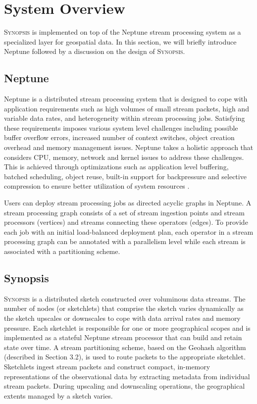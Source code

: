 \section{System Overview}
\label{sec:system}
\textsc{Synopsis} is implemented on top of the Neptune stream processing system \cite{buddhika2016neptune} as a specialized layer for geospatial data.
In this section, we will briefly introduce Neptune followed by a discussion on the design of \textsc{Synopsis}.

\subsection{Neptune}
Neptune is a distributed stream processing system that is designed to cope with application requirements such as high volumes of small stream packets, high and variable data rates, and heterogeneity within stream processing jobs.
Satisfying these requirements imposes various system level challenges including possible buffer overflow errors, increased number of context switches, object creation overhead and memory management issues.
Neptune takes a holistic approach that considers CPU, memory, network and kernel issues to address these challenges.
This is achieved through optimizations such as application level buffering, batched scheduling, object reuse, built-in support for backpressure and selective compression to ensure better utilization of system resources \cite{buddhika2016neptune}.

Users can deploy stream processing jobs as directed acyclic graphs in Neptune.
A stream processing graph consists of a set of stream ingestion points and stream processors (vertices) and streams connecting these operators (edges).
To provide each job with an initial load-balanced deployment plan, each operator in a stream processing graph can be annotated with a parallelism level while each stream is associated with a partitioning scheme.

\subsection{Synopsis}
\textsc{Synopsis} is a distributed sketch constructed over voluminous data streams.
The number of nodes (or sketchlets) that comprise the sketch varies dynamically as the sketch upscales or downscales to cope with data arrival rates and memory pressure.
Each sketchlet is responsible for one or more geographical scopes and is implemented as a stateful Neptune stream processor that can build and retain state over time.
A stream partitioning scheme, based on the Geohash algorithm (described in Section 3.2), is used to route packets to the appropriate sketchlet.
Sketchlets ingest stream packets and construct compact, in-memory representations of the observational data by extracting metadata from individual stream packets.
During upscaling and downscaling operations, the geographical extents managed by a sketch varies.

